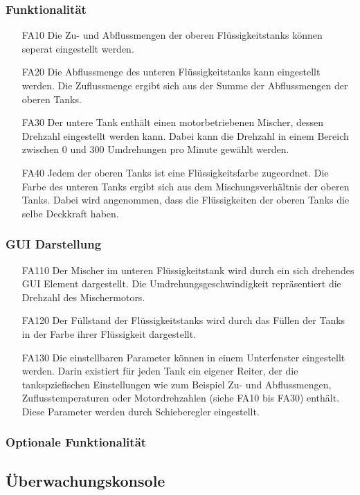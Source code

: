 \documentclass[parskip=full]{scrartcl}
\begin{document}
\subsubsection{Funktionalität}
\begin{enumerate}
\item[FA10] Die Zu- und Abflussmengen der oberen Flüssigkeitstanks können seperat eingestellt werden.
\item[FA20] Die Abflussmenge des unteren Flüssigkeitstanks kann eingestellt werden. Die Zuflussmenge ergibt sich aus der Summe der Abflussmengen der oberen Tanks.
\item[FA30] Der untere Tank enthält einen motorbetriebenen Mischer, dessen Drehzahl eingestellt werden kann. Dabei kann die Drehzahl in einem Bereich zwischen
0 und 300 Umdrehungen pro Minute gewählt werden.
\item[FA40] Jedem der oberen Tanks ist eine Flüssigkeitsfarbe zugeordnet. Die Farbe des unteren Tanks ergibt sich aus dem Mischungsverhältnis der oberen Tanks. Dabei wird
angenommen, dass die Flüssigkeiten der oberen Tanks die selbe Deckkraft haben.
\end{enumerate}
\subsubsection{GUI Darstellung}
\begin{enumerate}
\item[FA110] Der Mischer im unteren Flüssigkeitstank wird durch ein sich drehendes GUI Element dargestellt.
Die Umdrehungsgeschwindigkeit repräsentiert die Drehzahl des Mischermotors.
\item[FA120] Der Füllstand der Flüssigkeitstanks wird durch das Füllen der Tanks in der Farbe ihrer Flüssigkeit dargestellt.
\item[FA130] Die einstellbaren Parameter können in einem Unterfenster eingestellt werden. Darin existiert für jeden Tank ein eigener Reiter, der die 
tankspziefischen Einstellungen wie zum Beispiel Zu- und Abflussmengen, Zuflusstemperaturen oder Motordrehzahlen (siehe FA10 bis FA30) enthält.
Diese Parameter werden durch Schieberegler eingestellt.
\end{enumerate}
\subsubsection{Optionale Funktionalität}
\Blindtext[1]
\subsection{Überwachungskonsole}
\end{document}
